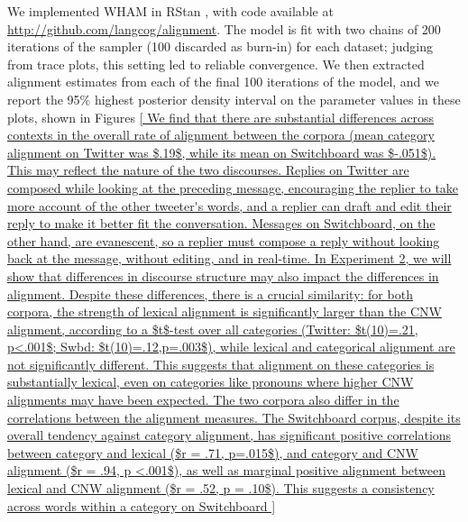 \documentclass[11pt]{article}
\begin{document}
We implemented WHAM in RStan \cite{Stan}, with code available at \url{http://github.com/langcog/alignment}. The model is fit with two chains of 200 iterations of the sampler (100 discarded as burn-in) for each dataset; judging from trace plots, this setting led to reliable convergence.  We then extracted alignment estimates from each of the final 100 iterations of the model, and we report the 95\% highest posterior density interval on the parameter values in these plots, shown in Figures \ref{

We find that there are substantial differences across contexts in the overall rate of alignment between the corpora (mean category alignment on Twitter was $.19$, while its mean on Switchboard was $-.051$). This may reflect the nature of the two discourses. Replies on Twitter are composed while looking at the preceding message, encouraging the replier to take more account of the other tweeter's words, and a replier can draft and edit their reply to make it better fit the conversation.  Messages on Switchboard, on the other hand, are evanescent, so a replier must compose a reply without looking back at the message, without editing, and in real-time.  In Experiment 2, we will show that differences in discourse structure may also impact the differences in alignment.

Despite these differences, there is a crucial similarity: for both corpora, the strength of lexical alignment is significantly larger than the CNW alignment, according to a $t$-test over all categories (Twitter: $t(10)=.21, p<.001$; Swbd: $t(10)=.12,p=.003$), while lexical and categorical alignment are not significantly different. This suggests that alignment on these categories is substantially lexical, even on categories like pronouns where higher CNW alignments may have been expected.

The two corpora also differ in the correlations between the alignment measures. The Switchboard corpus, despite its overall tendency against category alignment, has significant positive correlations between category and lexical ($r = .71, p=.015$), and category and CNW alignment ($r = .94, p <.001$), as well as marginal positive alignment between lexical and CNW alignment ($r = .52, p = .10$).  This suggests a consistency across words within a category on Switchboard 

}
\end{document}

